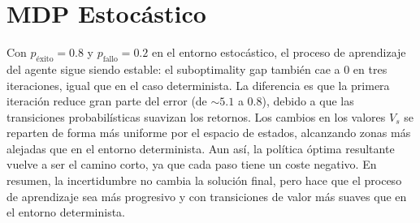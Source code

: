 \documentclass[a4paper,12pt]{article}
\begin{document}
\section{MDP Estocástico}

Con $p_\text{éxito}=0.8$ y $p_\text{fallo}=0.2$ en el entorno estocástico, el proceso de aprendizaje del agente sigue siendo estable: el suboptimality gap también cae a 0 en tres iteraciones, igual que en el caso determinista.
La diferencia es que la primera iteración reduce gran parte del error (de $\sim 5.1$ a $0.8$), debido a que las transiciones probabilísticas suavizan los retornos.
Los cambios en los valores $V_s$ se reparten de forma más uniforme por el espacio de estados, alcanzando zonas más alejadas que en el entorno determinista.
Aun así, la política óptima resultante vuelve a ser el camino corto, ya que cada paso tiene un coste negativo.
En resumen, la incertidumbre no cambia la solución final, pero hace que el proceso de aprendizaje sea más progresivo y con transiciones de valor más suaves que en el entorno determinista.
\end{document}
